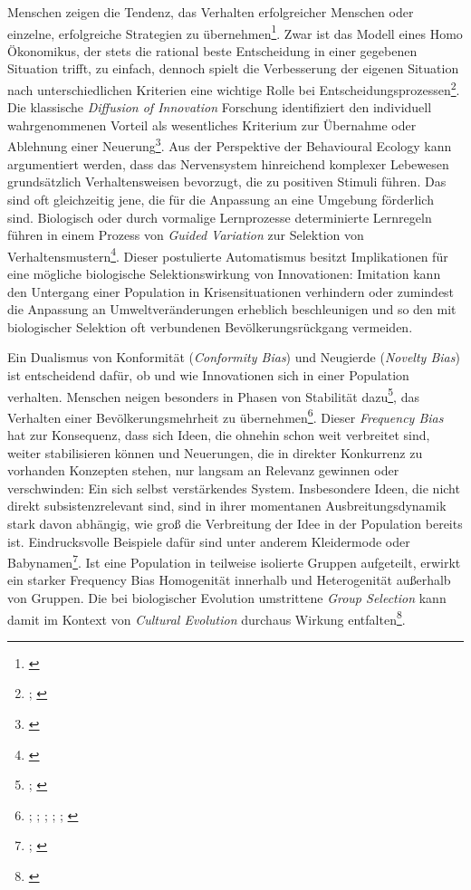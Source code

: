 \documentclass[openany,twoside,twocolumn]{book}
\let\rmarkdownfootnote\footnote%
\def\footnote{\protect\rmarkdownfootnote}
\begin{document}
Menschen zeigen die Tendenz, das Verhalten erfolgreicher Menschen oder einzelne, erfolgreiche Strategien zu übernehmen\footnote{\textcite{henrich_evolution_2003}}. Zwar ist das Modell eines Homo Ökonomikus, der stets die rational beste Entscheidung in einer gegebenen Situation trifft, zu einfach, dennoch spielt die Verbesserung der eigenen Situation nach unterschiedlichen Kriterien eine wichtige Rolle bei Entscheidungsprozessen\footnote{\textcite{mesoudi_cultural_2008}; \textcite{mesoudi_experimental_2011}}. Die klassische \emph{Diffusion of Innovation} Forschung identifiziert den individuell wahrgenommenen Vorteil als wesentliches Kriterium zur Übernahme oder Ablehnung einer Neuerung\footnote{\textcite{rogers_diffusion_1983}}. Aus der Perspektive der Behavioural Ecology kann argumentiert werden, dass das Nervensystem hinreichend komplexer Lebewesen grundsätzlich Verhaltensweisen bevorzugt, die zu positiven Stimuli führen. Das sind oft gleichzeitig jene, die für die Anpassung an eine Umgebung förderlich sind. Biologisch oder durch vormalige Lernprozesse determinierte Lernregeln führen in einem Prozess von \emph{Guided Variation} zur Selektion von Verhaltensmustern\footnote{\textcite{smith_cultural_1992}}. Dieser postulierte Automatismus besitzt Implikationen für eine mögliche biologische Selektionswirkung von Innovationen: Imitation kann den Untergang einer Population in Krisensituationen verhindern oder zumindest die Anpassung an Umweltveränderungen erheblich beschleunigen und so den mit biologischer Selektion oft verbundenen Bevölkerungsrückgang vermeiden.

Ein Dualismus von Konformität (\emph{Conformity Bias}) und Neugierde (\emph{Novelty Bias}) ist entscheidend dafür, ob und wie Innovationen sich in einer Population verhalten. Menschen neigen besonders in Phasen von Stabilität dazu\footnote{\textcite{henrich_evolution_1998}; \textcite{kendal_evolution_2009}}, das Verhalten einer Bevölkerungsmehrheit zu übernehmen\footnote{\textcite{bikhchandani_learning_1998}; \textcite{efferson_conformists_2008}; \textcite{giraldeau_social_1994}; \textcite{henrich_evolution_1998}; \textcite{heinrich_why_2001}; \textcite{smith_conformity_1994}}. Dieser \emph{Frequency Bias} hat zur Konsequenz, dass sich Ideen, die ohnehin schon weit verbreitet sind, weiter stabilisieren können und Neuerungen, die in direkter Konkurrenz zu vorhanden Konzepten stehen, nur langsam an Relevanz gewinnen oder verschwinden: Ein sich selbst verstärkendes System. Insbesondere Ideen, die nicht direkt subsistenzrelevant sind, sind in ihrer momentanen Ausbreitungsdynamik stark davon abhängig, wie groß die Verbreitung der Idee in der Population bereits ist. Eindrucksvolle Beispiele dafür sind unter anderem Kleidermode oder Babynamen\footnote{\textcite{acerbi_biases_2014}; \textcite{acerbi_logic_2012}}. Ist eine Population in teilweise isolierte Gruppen aufgeteilt, erwirkt ein starker Frequency Bias Homogenität innerhalb und Heterogenität außerhalb von Gruppen. Die bei biologischer Evolution umstrittene \emph{Group Selection} kann damit im Kontext von \emph{Cultural Evolution} durchaus Wirkung entfalten\footnote{\textcite{smith_cultural_1992}}.
\end{document}
